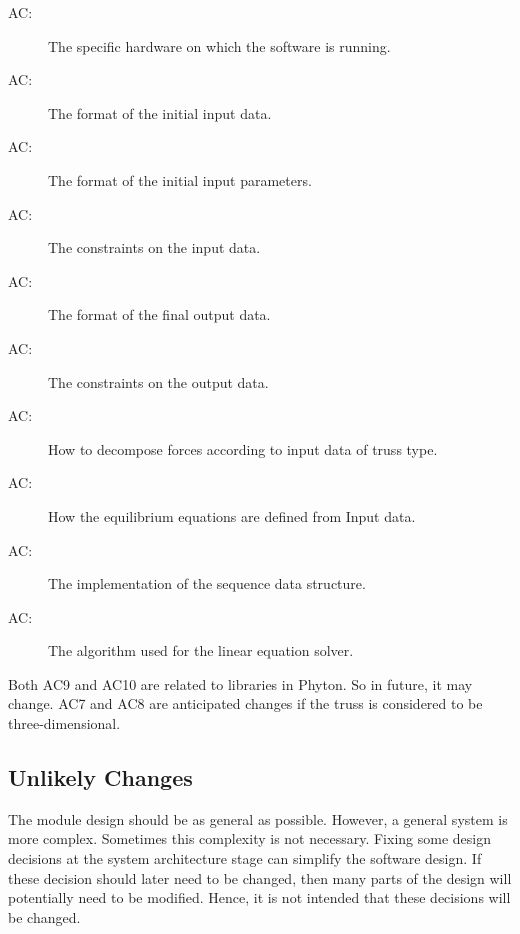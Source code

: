 \documentclass[12pt, titlepage]{article}
\newcounter{acnum}
\newcommand{\actheacnum}{AC\theacnum}
\begin{document}
\begin{description}
\item[ \actheacnum \label{acHardware}:] The specific
  hardware on which the software is running.
\item[ \actheacnum \label{acInput}:] The format of the
  initial input data.
 \item[ \actheacnum \label{acParam}:] The format of the
  initial input parameters.
  \item[ \actheacnum \label{acVerify}:] The constraints on the input data.
\item[ \actheacnum \label{acOutput}:] The format of the final output data.  
\item[ \actheacnum \label{acOutVeri}:] The constraints on the output data.
\item[ \actheacnum \label{acDecompos}:] How to decompose forces according to input data of truss type.
\item[ \actheacnum \label{acEq}:] How the equilibrium equations are defined from Input data.
\item[ \actheacnum \label{acSeq}:] The implementation of the sequence data structure.
\item[ \actheacnum \label{acLinalg}:] The algorithm used for the linear equation solver.
 
\end{description}
 Both AC9 and AC10 are related to libraries in Phyton. So in future, it may change. AC7 and AC8 are anticipated changes if the truss is considered to be three-dimensional. 

\subsection{Unlikely Changes} \label{SecUchange}

The module design should be as general as possible. However, a general system is
more complex. Sometimes this complexity is not necessary. Fixing some design
decisions at the system architecture stage can simplify the software design. If
these decision should later need to be changed, then many parts of the design
will potentially need to be modified. Hence, it is not intended that these
decisions will be changed.
\end{document}
